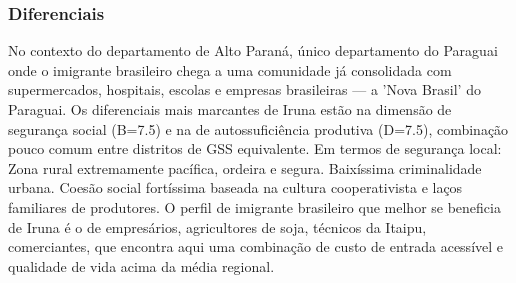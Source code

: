 \subsubsection*{Diferenciais}\label{dif-iruna-1019}
No contexto do departamento de Alto Paraná, único departamento do Paraguai onde o imigrante brasileiro chega a uma comunidade já consolidada com supermercados, hospitais, escolas e empresas brasileiras — a 'Nova Brasil' do Paraguai. Os diferenciais mais marcantes de Iruna estão na dimensão de segurança social (B=7.5) e na de autossuficiência produtiva (D=7.5), combinação pouco comum entre distritos de GSS equivalente. Em termos de segurança local: Zona rural extremamente pacífica, ordeira e segura. Baixíssima criminalidade urbana. Coesão social fortíssima baseada na cultura cooperativista e laços familiares de produtores. O perfil de imigrante brasileiro que melhor se beneficia de Iruna é o de empresários, agricultores de soja, técnicos da Itaipu, comerciantes, que encontra aqui uma combinação de custo de entrada acessível e qualidade de vida acima da média regional.

